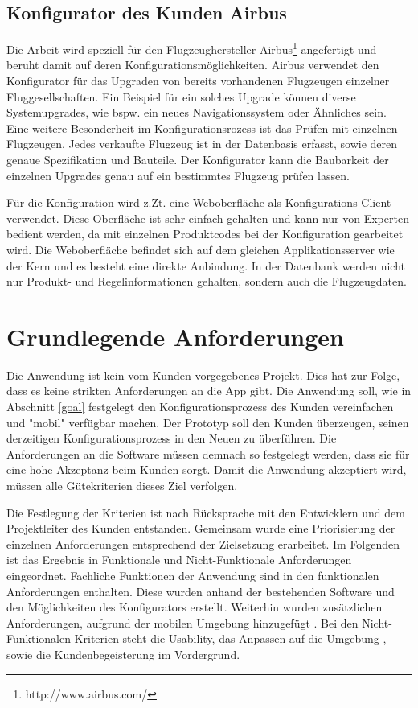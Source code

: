 \subsection{Konfigurator des Kunden Airbus}
Die Arbeit wird speziell für den Flugzeughersteller Airbus\footnote{http://www.airbus.com/} angefertigt und beruht damit auf deren Konfigurationsmöglichkeiten. Airbus verwendet den Konfigurator für das Upgraden von bereits vorhandenen Flugzeugen einzelner Fluggesellschaften. Ein Beispiel für ein solches Upgrade können diverse Systemupgrades, wie bspw. ein neues Navigationssystem oder Ähnliches sein. Eine weitere Besonderheit im Konfigurationsrozess ist das Prüfen mit einzelnen Flugzeugen. Jedes verkaufte Flugzeug ist in der Datenbasis erfasst, sowie deren genaue Spezifikation und Bauteile. Der Konfigurator kann die Baubarkeit der einzelnen Upgrades genau auf ein bestimmtes Flugzeug prüfen lassen. \par

Für die Konfiguration wird z.Zt. eine Weboberfläche als Konfigurations-Client verwendet. Diese Oberfläche ist sehr einfach gehalten und kann nur von Experten bedient werden, da mit einzelnen Produktcodes bei der Konfiguration gearbeitet wird. Die Weboberfläche befindet sich auf dem gleichen Applikationsserver wie der Kern und es besteht eine direkte Anbindung. In der Datenbank werden nicht nur Produkt- und Regelinformationen gehalten, sondern auch die Flugzeugdaten. 

  
\section{Grundlegende Anforderungen}
Die Anwendung ist kein vom Kunden vorgegebenes Projekt. Dies hat zur Folge, dass es keine strikten Anforderungen an die App gibt. Die Anwendung soll, wie in Abschnitt \ref{goal} festgelegt den Konfigurationsprozess des Kunden vereinfachen und "mobil" verfügbar machen. Der Prototyp soll den Kunden überzeugen, seinen derzeitigen Konfigurationsprozess in den Neuen zu überführen. Die Anforderungen an die Software müssen demnach so festgelegt werden, dass sie für eine hohe Akzeptanz beim Kunden sorgt. Damit die Anwendung akzeptiert wird, müssen alle Gütekriterien dieses Ziel verfolgen. \par

Die Festlegung der Kriterien ist nach Rücksprache mit den Entwicklern und dem Projektleiter des Kunden entstanden. Gemeinsam wurde eine Priorisierung der einzelnen Anforderungen entsprechend der Zielsetzung erarbeitet. Im Folgenden ist das Ergebnis in Funktionale und Nicht-Funktionale Anforderungen eingeordnet. Fachliche Funktionen der Anwendung sind in den funktionalen Anforderungen enthalten. Diese wurden anhand der bestehenden Software und den Möglichkeiten des Konfigurators erstellt. Weiterhin wurden zusätzlichen Anforderungen, aufgrund der mobilen Umgebung hinzugefügt . Bei den Nicht-Funktionalen Kriterien steht die Usability, das Anpassen auf die Umgebung , sowie die Kundenbegeisterung im Vordergrund. 

